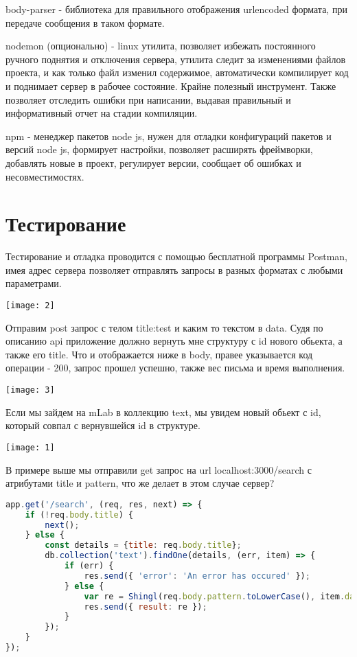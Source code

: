 body-parser - библиотека для правильного отображения urlencoded формата, при передаче сообщения в таком формате.

nodemon (опционально) - linux утилита, позволяет избежать постоянного ручного поднятия и отключения сервера, утилита следит за изменениями файлов проекта, и как только файл изменил содержимое, автоматически компилирует код и поднимает сервер в рабочее состояние. Крайне полезный инструмент. Также позволяет отследить ошибки при написании, выдавая правильный и информативный отчет на стадии компиляции.

npm - менеджер пакетов node js, нужен для отладки конфигураций пакетов и версий node js, формирует настройки, позволяет расширять фреймворки, добавлять новые в проект, регулирует версии, сообщает об ошибках и несовместимостях.

\section*{Тестирование}

Тестирование и отладка проводится с помощью бесплатной программы Postman, имея адрес сервера позволяет отправлять запросы в разных форматах с любыми параметрами.

\texttt{[image: 2]}

Отправим post запрос с телом title:test и каким то текстом в data. Судя по описанию api приложение должно вернуть мне структуру с id нового обьекта, а также его title. Что и отображается ниже в body, правее указывается код операции - 200, запрос прошел успешно, также вес письма и время выполнения.

\texttt{[image: 3]}

Если мы зайдем на mLab в коллекцию text, мы увидем новый обьект с id, который совпал с вернувшейся id в структуре.

\texttt{[image: 1]}

В примере выше мы отправили get запрос на url localhost:3000/search с атрибутами title и pattern, что же делает в этом случае сервер?

\begin{lstlisting}[language=JavaScript]
app.get('/search', (req, res, next) => {
    if (!req.body.title) {
        next();
    } else {
        const details = {title: req.body.title};
        db.collection('text').findOne(details, (err, item) => {
            if (err) {
                res.send({ 'error': 'An error has occured' });
            } else {
                var re = Shingl(req.body.pattern.toLowerCase(), item.data);
                res.send({ result: re });
            }
        });
    }
});
\end{lstlisting}

